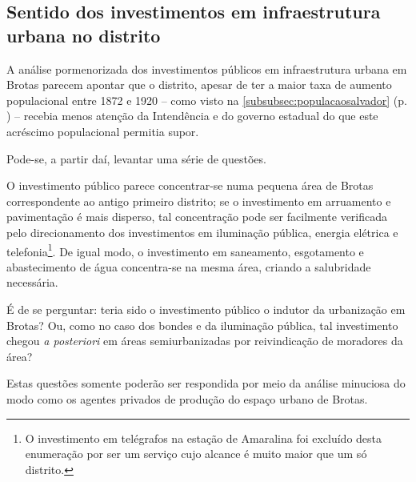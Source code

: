 \subsection{Sentido dos investimentos em infraestrutura urbana no distrito}

A análise pormenorizada dos investimentos públicos em infraestrutura urbana em Brotas parecem apontar que o distrito, apesar de ter a maior taxa de aumento populacional entre 1872 e 1920 -- como visto na \autoref{subsubsec:populacaosalvador} (p. \pageref{subsubsec:populacaosalvador}) -- recebia menos atenção da Intendência e do governo estadual do que este acréscimo populacional permitia supor.

Pode-se, a partir daí, levantar uma série de questões. 

O investimento público parece concentrar-se numa pequena área de Brotas correspondente ao antigo primeiro distrito; se o investimento em arruamento e pavimentação é mais disperso, tal concentração pode ser facilmente verificada pelo direcionamento dos investimentos em iluminação pública, energia elétrica e telefonia\footnote{O investimento em telégrafos na estação de Amaralina foi excluído desta enumeração por ser um serviço cujo alcance é muito maior que um só distrito.}.  De igual modo, o investimento em saneamento, esgotamento e abastecimento de água concentra-se na mesma área, criando a salubridade necessária.

É de se perguntar: teria sido o investimento público o indutor da urbanização em Brotas? Ou, como no caso dos bondes e da iluminação pública, tal investimento chegou \textit{a posteriori} em áreas semiurbanizadas por reivindicação de moradores da área?

Estas questões somente poderão ser respondida por meio da análise minuciosa do modo como os agentes privados de produção do espaço urbano de Brotas.